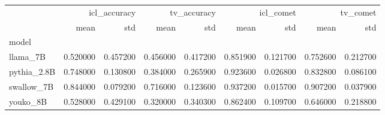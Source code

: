\begin{tabular}{lrrrrrrrr}
\toprule
 & \multicolumn{2}{r}{icl_accuracy} & \multicolumn{2}{r}{tv_accuracy} & \multicolumn{2}{r}{icl_comet} & \multicolumn{2}{r}{tv_comet} \\
 & mean & std & mean & std & mean & std & mean & std \\
model &  &  &  &  &  &  &  &  \\
\midrule
llama_7B & 0.520000 & 0.457200 & 0.456000 & 0.417200 & 0.851900 & 0.121700 & 0.752600 & 0.212700 \\
pythia_2.8B & 0.748000 & 0.130800 & 0.384000 & 0.265900 & 0.923600 & 0.026800 & 0.832800 & 0.086100 \\
swallow_7B & 0.844000 & 0.079200 & 0.716000 & 0.123600 & 0.937200 & 0.015700 & 0.907200 & 0.037900 \\
youko_8B & 0.528000 & 0.429100 & 0.320000 & 0.340300 & 0.862400 & 0.109700 & 0.646000 & 0.218800 \\
\bottomrule
\end{tabular}
